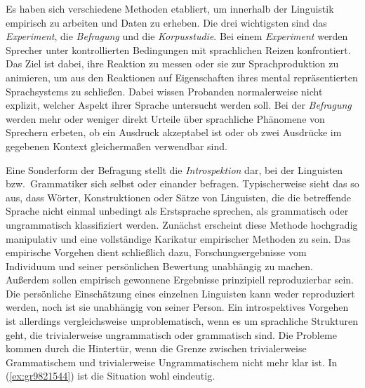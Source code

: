 Es haben sich verschiedene Methoden etabliert, um innerhalb der Linguistik empirisch zu arbeiten und Daten zu erheben.
Die drei wichtigsten sind das \textit{Experiment}, die \textit{Befragung} und die \textit{Korpusstudie}.
Bei einem \textit{Experiment} werden Sprecher unter kontrollierten Bedingungen mit sprachlichen Reizen konfrontiert.
Das Ziel ist dabei, ihre Reaktion zu messen oder sie zur Sprachproduktion zu animieren, um aus den Reaktionen auf Eigenschaften ihres mental repräsentierten Sprachsystems zu schließen.
Dabei wissen Probanden normalerweise nicht explizit, welcher Aspekt ihrer Sprache untersucht werden soll.
Bei der \textit{Befragung} werden mehr oder weniger direkt Urteile über sprachliche Phänomene von Sprechern erbeten, \zB ob ein Ausdruck akzeptabel ist oder ob zwei Ausdrücke im gegebenen Kontext gleichermaßen verwendbar sind.

Eine Sonderform der Befragung stellt die \textit{Introspektion} dar, bei der Linguisten bzw.\ Grammatiker sich selbst oder einander befragen.
Typischerweise sieht das so aus, dass Wörter, Konstruktionen oder Sätze von Linguisten, die die betreffende Sprache nicht einmal unbedingt als Erstsprache sprechen, als grammatisch oder ungrammatisch klassifiziert werden.
Zunächst erscheint diese Methode hochgradig manipulativ und eine vollständige Karikatur empirischer Methoden zu sein.
Das empirische Vorgehen dient schließlich dazu, Forschungsergebnisse vom Individuum und seiner persönlichen Bewertung unabhängig zu machen.
Außerdem sollen empirisch gewonnene Ergebnisse prinzipiell reproduzierbar sein.
Die persönliche Einschätzung eines einzelnen Linguisten kann weder reproduziert werden, noch ist sie unabhängig von seiner Person.
Ein introspektives Vorgehen ist allerdings vergleichsweise unproblematisch, wenn es um sprachliche Strukturen geht, die trivialerweise ungrammatisch oder grammatisch sind.
Die Probleme kommen durch die Hintertür, wenn die Grenze zwischen trivialerweise Grammatischem und trivialerweise Ungrammatischem nicht mehr klar ist.
In (\ref{ex:gr9821544}) ist die Situation wohl eindeutig.

\begin{exe}
	\ex\label{ex:gr9821544}
	\begin{xlist}
	\end{xlist}
\end{exe}


